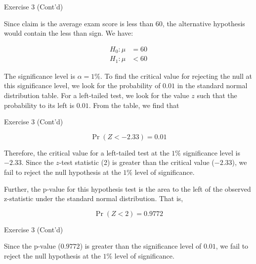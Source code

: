 \documentclass[
  ignorenonframetext,
  aspectratio=43,
]{beamer}
\begin{document}
\begin{frame}{Exercise 3 (Cont'd)}
\protect\hypertarget{exercise-3-contd}{}
\pause

Since claim is the average exam score is less than 60, the alternative
hypothesis would contain the less than sign. We have: \vspace{-4pt}

\pause

\[
\begin{aligned}
H_0:\mu &= 60 \\
H_1:\mu &< 60
\end{aligned}
\]

\pause

The significance level is \(\alpha=1\%\). To find the critical value for
rejecting the null at this significance level, we look for the
probability of \(0.01\) in the standard normal distribution table. For a
left-tailed test, we look for the value \(z\) such that the probability
to its left is \(0.01\). From the table, we find that
\end{frame}

\begin{frame}{Exercise 3 (Cont'd)}
\protect\hypertarget{exercise-3-contd-1}{}
\pause

\[
\Pr(Z<-2.33)=0.01
\]

\pause

Therefore, the critical value for a left-tailed test at the \(1\%\)
significance level is \(-2.33\). Since the \(z\)-test statistic (2) is
greater than the critical value (\(-2.33\)), we fail to reject the null
hypothesis at the \(1\%\) level of significance.

\pause

Further, the p-value for this hypothesis test is the area to the left of
the observed z-statistic under the standard normal distribution. That
is, \vspace{-4pt}

\pause

\[
\Pr(Z<2)=0.9772
\]
\end{frame}

\begin{frame}{Exercise 3 (Cont'd)}
\protect\hypertarget{exercise-3-contd-2}{}
\pause

Since the p-value (\(0.9772\)) is greater than the significance level of
\(0.01\), we fail to reject the null hypothesis at the \(1\%\) level of
significance.
\end{frame}
\end{document}
